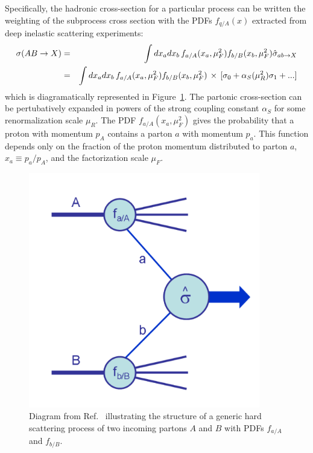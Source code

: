 Specifically, the hadronic cross-section for a particular process can be written the weighting of the subprocess cross section with the PDFs $f_{q/A}(x)$ extracted from deep inelastic scattering experiments\cite{Campbell:2006wx}:
\begin{eqnarray}
\sigma(AB\rightarrow X) &=& \int dx_a dx_b \,f_{a/A}(x_a,\mu_F^2) f_{b/B}(x_b,\mu_F^2) \hat{\sigma}_{ab \rightarrow X} \nonumber \\
&=& \int dx_a dx_b \,f_{a/A}(x_a,\mu_F^2) f_{b/B}(x_b,\mu_F^2) \,\times\,[\sigma_0 + \alpha_{S}(\mu_R^2)\sigma_1 + ...]
\end{eqnarray}
which is diagramatically represented in Figure~\ref{fig:factorize}. The partonic cross-section can be pertubatively expanded in powers of the strong coupling constant $\alpha_S$ for some renormalization scale $\mu_R$. The PDF $f_{a/A}(x_a,\mu_F^2)$ gives the probability that a proton with momentum $p_A$ contains a parton $a$ with momentum $p_a$. This function depends only on the fraction of the proton momentum distributed to parton $a$, $x_a \equiv p_a/p_A$, and the factorization scale $\mu_F$. 
\begin{figure}[h]
\includegraphics[width=0.9\textwidth]{fig/thry/Factorize.pdf}
\caption{Diagram from Ref.~\cite{Campbell:2006wx} illustrating the structure of a generic hard scattering process of two incoming partons $A$ and $B$ with PDFs $f_{a/A}$ and $f_{b/B}$.}
\label{fig:factorize}
\end{figure}










